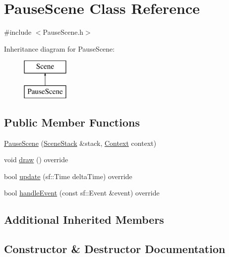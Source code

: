 \hypertarget{class_pause_scene}{}\section{Pause\+Scene Class Reference}
\label{class_pause_scene}


{\ttfamily \#include $<$Pause\+Scene.\+h$>$}

Inheritance diagram for Pause\+Scene\+:\begin{figure}[H]
\begin{center}
\leavevmode
\includegraphics[height=2.000000cm]{class_pause_scene}
\end{center}
\end{figure}
\subsection*{Public Member Functions}
\begin{DoxyCompactItemize}
\item 
\hyperlink{class_pause_scene_a65ac2aa9fca0b1027481e60417749c4f}{Pause\+Scene} (\hyperlink{class_scene_stack}{Scene\+Stack} \&stack, \hyperlink{struct_scene_1_1_context}{Context} context)
\item 
void \hyperlink{class_pause_scene_abfd1398a064a83b3ae6ac5fd98aebf05}{draw} () override
\item 
bool \hyperlink{class_pause_scene_a8504260009b4dfb2380785e938e60b4b}{update} (sf\+::\+Time delta\+Time) override
\item 
bool \hyperlink{class_pause_scene_adeb06e37e0a2afa297ddbe795c3cbe94}{handle\+Event} (const sf\+::\+Event \&event) override
\end{DoxyCompactItemize}
\subsection*{Additional Inherited Members}


\subsection{Constructor \& Destructor Documentation}
\hypertarget{class_pause_scene_a65ac2aa9fca0b1027481e60417749c4f}{}\label{class_pause_scene_a65ac2aa9fca0b1027481e60417749c4f} 
